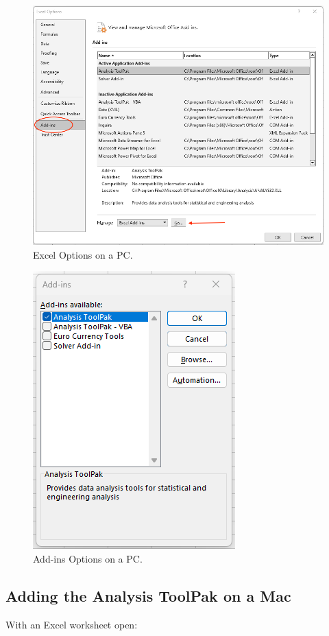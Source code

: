 \documentclass[
]{book}
\begin{document}
\begin{figure}

{\centering \includegraphics[width=0.75\linewidth]{images/toolpak-pc1} 

}

\caption{Excel Options on a PC.}\label{fig:analysis-toolpak-pc1}
\end{figure}
\begin{figure}

{\centering \includegraphics[width=0.35\linewidth]{images/toolpak-pc2} 

}

\caption{Add-ins Options on a PC.}\label{fig:analysis-toolpak-pc2}
\end{figure}

\hypertarget{adding-the-analysis-toolpak-on-a-mac}{%
\subsection{Adding the Analysis ToolPak on a Mac}\label{adding-the-analysis-toolpak-on-a-mac}}

With an Excel worksheet open:
\end{document}
